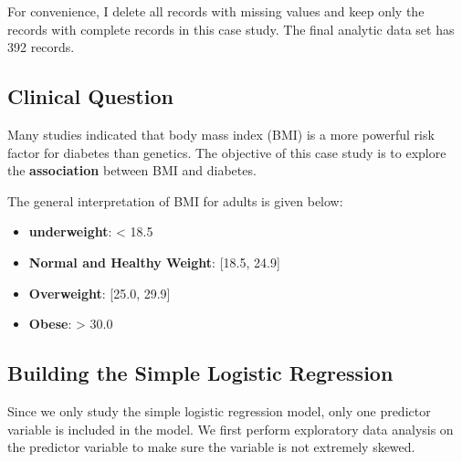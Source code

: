 \documentclass[
]{book}
\newenvironment{Shaded}{\begin{snugshade}}{\end{snugshade}}
\newcommand{\AttributeTok}[1]{\textcolor[rgb]{0.13,0.29,0.53}{#1}}
\newcommand{\ConstantTok}[1]{\textcolor[rgb]{0.56,0.35,0.01}{#1}}
\newcommand{\DecValTok}[1]{\textcolor[rgb]{0.00,0.00,0.81}{#1}}
\newcommand{\FunctionTok}[1]{\textcolor[rgb]{0.13,0.29,0.53}{\textbf{#1}}}
\newcommand{\NormalTok}[1]{#1}
\newcommand{\OtherTok}[1]{\textcolor[rgb]{0.56,0.35,0.01}{#1}}
\newcommand{\SpecialCharTok}[1]{\textcolor[rgb]{0.81,0.36,0.00}{\textbf{#1}}}
\newcommand{\StringTok}[1]{\textcolor[rgb]{0.31,0.60,0.02}{#1}}
\providecommand{\tightlist}{%
  \setlength{\itemsep}{0pt}\setlength{\parskip}{0pt}}
\begin{document}
For convenience, I delete all records with missing values and keep only the records with complete records in this case study. The final analytic data set has 392 records.

\hypertarget{clinical-question}{%
\subsection{Clinical Question}\label{clinical-question}}

Many studies indicated that body mass index (BMI) is a more powerful risk factor for diabetes than genetics. The objective of this case study is to explore the \textbf{association} between BMI and diabetes.

The general interpretation of BMI for adults is given below:

\begin{itemize}
\tightlist
\item
  \textbf{underweight}: \textless{} 18.5
\item
  \textbf{Normal and Healthy Weight}: {[}18.5, 24.9{]}
\item
  \textbf{Overweight}: {[}25.0, 29.9{]}
\item
  \textbf{Obese}: \textgreater{} 30.0
\end{itemize}

\hypertarget{building-the-simple-logistic-regression}{%
\subsection{Building the Simple Logistic Regression}\label{building-the-simple-logistic-regression}}

Since we only study the simple logistic regression model, only one predictor variable is included in the model. We first perform exploratory data analysis on the predictor variable to make sure the variable is not extremely skewed.

\begin{Shaded}
\end{Shaded}
\end{document}
